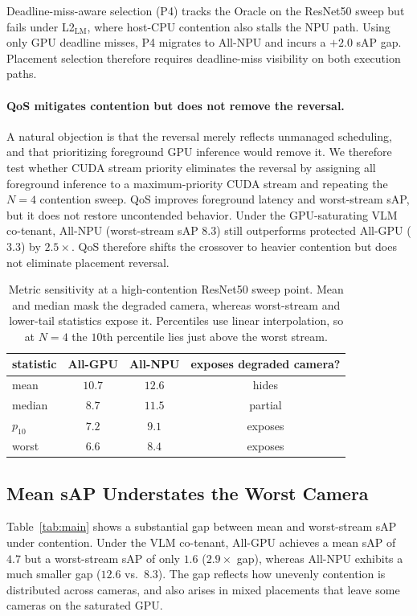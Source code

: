 \documentclass[runningheads]{llncs}
\newcommand{\Llm}{L2$_{\text{LM}}$}
\begin{document}
Deadline-miss-aware selection (P4) tracks the Oracle on the ResNet50 sweep but fails under \Llm{}, where host-CPU contention also stalls the NPU path. Using only GPU deadline misses, P4 migrates to All-NPU and incurs a $+2.0$ sAP gap. Placement selection therefore requires deadline-miss visibility on both execution paths.






\paragraph{\textbf{QoS mitigates contention but does not remove the reversal.}}
\label{sec:results:qos}

A natural objection is that the reversal merely reflects unmanaged scheduling, and that prioritizing foreground GPU inference would remove it. We therefore test whether CUDA stream priority eliminates the reversal by assigning all foreground inference to a maximum-priority CUDA stream and repeating the $N{=}4$ contention sweep. QoS improves foreground latency and worst-stream sAP, but it does not restore uncontended behavior. Under the GPU-saturating VLM co-tenant, All-NPU (worst-stream sAP $8.3$) still outperforms protected All-GPU ($3.3$) by $2.5\times$. QoS therefore shifts the crossover to heavier contention but does not eliminate placement reversal.


\begin{table}[tbp]
\centering
\caption{Metric sensitivity at a high-contention ResNet50 sweep point. Mean and median mask the degraded camera, whereas worst-stream and lower-tail statistics expose it. Percentiles use linear interpolation, so at $N{=}4$ the $10$th percentile lies just above the worst stream.}
\label{tab:metric-sensitivity}
\footnotesize
\setlength{\tabcolsep}{8pt}
\begin{tabular}{lccc}
\toprule
statistic & All-GPU & All-NPU & exposes degraded camera? \\
\midrule
mean      & $10.7$ & $12.6$ & hides \\
median    & $8.7$ & $11.5$ & partial \\
$p_{10}$  & $7.2$ & $9.1$ & exposes \\
worst     & $6.6$ & $8.4$ & exposes \\
\bottomrule
\end{tabular}
\end{table}

\subsection{Mean sAP Understates the Worst Camera}
\label{sec:results:worst}
Table~\ref{tab:main} shows a substantial gap between mean and worst-stream sAP under contention. Under the VLM co-tenant, All-GPU achieves a mean sAP of $4.7$ but a worst-stream sAP of only $1.6$ ($2.9\times$ gap), whereas All-NPU exhibits a much smaller gap ($12.6$ vs.\ $8.3$). The gap reflects how unevenly contention is distributed across cameras, and also arises in mixed placements that leave some cameras on the saturated GPU.
\end{document}
